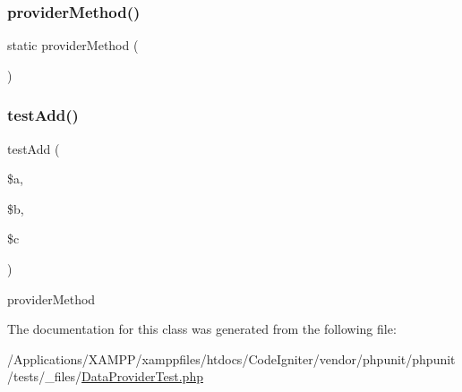 \subsubsection{\texorpdfstring{provider\+Method()}{providerMethod()}}
{\footnotesize\ttfamily static provider\+Method (\begin{DoxyParamCaption}{ }\end{DoxyParamCaption})\hspace{0.3cm}{\ttfamily [static]}}

\mbox{\label{class_data_provider_test_aee936425adb92ab632ef751353789f64}} 
\subsubsection{\texorpdfstring{test\+Add()}{testAdd()}}
{\footnotesize\ttfamily test\+Add (\begin{DoxyParamCaption}\item[{}]{\$a,  }\item[{}]{\$b,  }\item[{}]{\$c }\end{DoxyParamCaption})}

provider\+Method 

The documentation for this class was generated from the following file\+:\begin{DoxyCompactItemize}
\item 
/\+Applications/\+X\+A\+M\+P\+P/xamppfiles/htdocs/\+Code\+Igniter/vendor/phpunit/phpunit/tests/\+\_\+files/\mbox{\hyperlink{_data_provider_test_8php}{Data\+Provider\+Test.\+php}}\end{DoxyCompactItemize}
